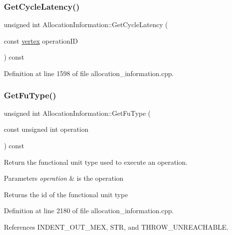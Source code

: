 \subsubsection{\texorpdfstring{Get\+Cycle\+Latency()}{GetCycleLatency()}\hspace{0.1cm}{\footnotesize\ttfamily [2/2]}}
{\footnotesize\ttfamily unsigned int Allocation\+Information\+::\+Get\+Cycle\+Latency (\begin{DoxyParamCaption}\item[{const \hyperlink{graph_8hpp_abefdcf0544e601805af44eca032cca14}{vertex}}]{operation\+ID }\end{DoxyParamCaption}) const}



Definition at line 1598 of file allocation\+\_\+information.\+cpp.

\mbox{\label{classAllocationInformation_aa65644e624477a27fe4288d30b88e627}} 
\subsubsection{\texorpdfstring{Get\+Fu\+Type()}{GetFuType()}\hspace{0.1cm}{\footnotesize\ttfamily [1/2]}}
{\footnotesize\ttfamily unsigned int Allocation\+Information\+::\+Get\+Fu\+Type (\begin{DoxyParamCaption}\item[{const unsigned int}]{operation }\end{DoxyParamCaption}) const}



Return the functional unit type used to execute an operation. 


\begin{DoxyParams}{Parameters}
{\em operation} & is the operation \\
\hline
\end{DoxyParams}
\begin{DoxyReturn}{Returns}
the id of the functional unit type 
\end{DoxyReturn}


Definition at line 2180 of file allocation\+\_\+information.\+cpp.



References I\+N\+D\+E\+N\+T\+\_\+\+O\+U\+T\+\_\+\+M\+EX, S\+TR, and T\+H\+R\+O\+W\+\_\+\+U\+N\+R\+E\+A\+C\+H\+A\+B\+LE.



